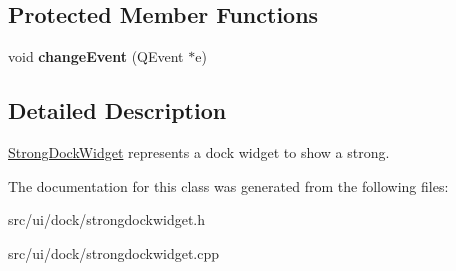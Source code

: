\subsection*{Protected Member Functions}
\begin{DoxyCompactItemize}
\item 
\hypertarget{classStrongDockWidget_a4c6066003a752cac859f02172b55a871}{
void {\bfseries changeEvent} (QEvent $\ast$e)}
\label{classStrongDockWidget_a4c6066003a752cac859f02172b55a871}

\end{DoxyCompactItemize}


\subsection{Detailed Description}
\hyperlink{classStrongDockWidget}{StrongDockWidget} represents a dock widget to show a strong. 

The documentation for this class was generated from the following files:\begin{DoxyCompactItemize}
\item 
src/ui/dock/strongdockwidget.h\item 
src/ui/dock/strongdockwidget.cpp\end{DoxyCompactItemize}

